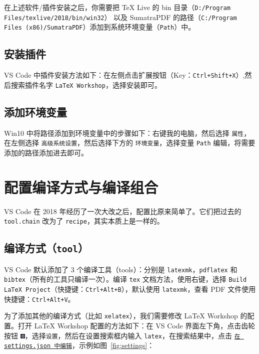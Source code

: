 \documentclass{article}
\begin{document}
在上述软件/插件安装之后，你需要把 \TeX{} Live 的 bin 目录（\texttt{D:/Program Files/texlive/2018/bin/win32}） 以及 SumatraPDF 的路径（\texttt{C:/Program Files (x86)/SumatraPDF}）添加到系统环境变量（\texttt{Path}）中。


\subsection{安装插件}
VS Code 中插件安装方法如下：在左侧点击扩展按钮（Key：\texttt{Ctrl+Shift+X}）,然后搜索插件名字 \texttt{LaTeX Workshop}，选择安装即可。

\subsection{添加环境变量}
Win10 中将路径添加到环境变量中的步骤如下：右键我的电脑，然后选择 \texttt{属性}，在左侧选择 \texttt{高级系统设置}，然后选择下方的 \texttt{环境变量}，选择变量 \texttt{Path} 编辑，将需要添加的路径添加进去即可。

\section{配置编译方式与编译组合}
VS Code 在 2018 年经历了一次大改之后，配置比原来简单了。它们把过去的 \texttt{tool.chain} 改为了 \texttt{recipe}，其实本质上是一样的。

\subsection{编译方式（\texttt{tool}）}
VS Code 默认添加了 3 个编译工具（tools）：分别是 \texttt{latexmk}，\texttt{pdflatex} 和 \texttt{bibtex}（所有的工具只编译一次）。编译 \texttt{tex} 文档方法，使用右键，选择 \texttt{Build LaTeX Project}（快捷键：\texttt{Ctrl+Alt+B}），默认使用 \texttt{latexmk}，查看 PDF 文件使用快捷键：\texttt{Ctrl+Alt+V}。

为了添加其他的编译方式（比如 \texttt{xelatex}），我们需要修改 \LaTeX{} Workshop 的配置。打开 LaTeX Workshop 配置的方法如下：在 VS Code 界面左下角，点击齿轮按钮 \includegraphics[width=0.018\textwidth]{setting.png}，选择\texttt{设置}，然后在设置搜索框内输入 \texttt{latex}，在搜索结果中，点击 \underline{\texttt{在 settings.json 中编辑}}，示例如图~\ref{fig:settings}：
\end{document}
